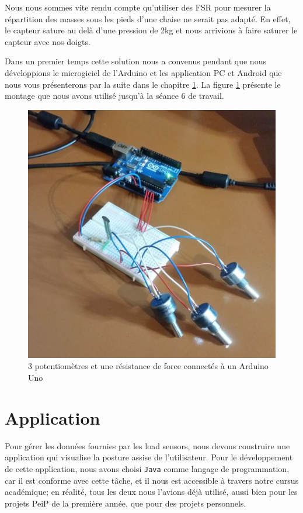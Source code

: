 \documentclass{polytech/polytech}
\begin{document}
Nous nous sommes vite rendu compte qu'utiliser des FSR pour mesurer la répartition des masses sous les pieds d'une chaise ne serait pas adapté. En effet, le capteur sature au delà d'une pression de 2kg et nous arrivions à faire saturer le capteur avec nos doigts.

Dans un premier temps cette solution nous a convenus pendant que nous développions le microgiciel de l'Arduino et les application PC et Android que nous vous présenterons par la suite dans le chapitre \ref{chap:Application}. La figure \ref{fig:arduino_v0} présente le montage que nous avons utilisé jusqu'à la séance 6 de travail.

\begin{figure}[htbp]
\begin{center}
\includegraphics[scale=0.6]{image/Arduino_v0.jpg}
\end{center}
\caption{3 potentiomètres et une résistance de force connectés à un Arduino Uno}
\label{fig:arduino_v0}
\end{figure}



\chapter{Application}
\label{chap:Application}

Pour gérer les données fournies par les load sensors, nous devons construire une application qui visualise la posture assise de l'utilisateur. Pour le développement de cette application, nous avons choisi \texttt{Java} comme langage de programmation, car il est conforme avec cette tâche, et il nous est accessible à travers notre cursus académique; en réalité, tous les deux nous l'avions déjà utilisé, aussi bien pour les projets PeiP de la première année, que pour des projets personnels.
\end{document}
